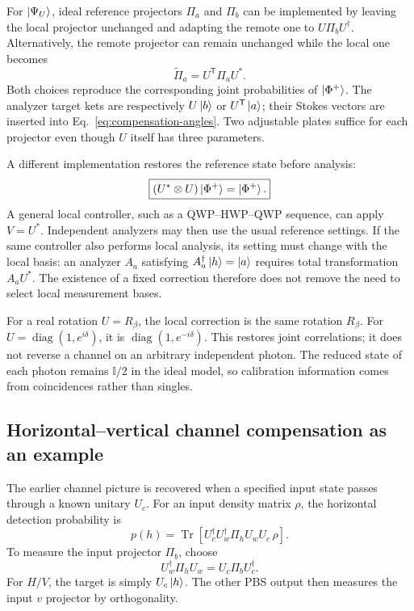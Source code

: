 \documentclass[a4paper,10pt]{article}
\newcommand{\I}{\mathbb{I}}
\newcommand{\Tr}{\operatorname{Tr}}
\begin{document}
For $\ket{\Psi_U}$, ideal reference projectors $\Pi_a$ and $\Pi_b$ can
be implemented by leaving the local projector unchanged and adapting
the remote one to $U\Pi_bU^\dagger$. Alternatively, the remote
projector can remain unchanged while the local one becomes
\begin{equation}
    \widetilde{\Pi}_a=U^{\mathsf T}\Pi_aU^*.
    \label{eq:local-effective-projector}
\end{equation}
Both choices reproduce the corresponding joint probabilities of
$\ket{\Phi^+}$. The analyzer target kets are respectively $U\ket b$
or $U^{\mathsf T}\ket a$; their Stokes vectors are inserted into
Eq.~\eqref{eq:compensation-angles}. Two adjustable plates suffice for
each projector even though $U$ itself has three parameters.

A different implementation restores the reference state before analysis:
\begin{equation}
    \boxed{(U^*\otimes U)\ket{\Phi^+}=\ket{\Phi^+}.}
    \label{eq:local-channel-correction}
\end{equation}
A general local controller, such as a QWP--HWP--QWP sequence, can apply
$V=U^*$. Independent analyzers may then use the usual reference settings.
If the same controller also performs local analysis, its setting must
change with the local basis: an analyzer $A_a$ satisfying
$A_a^\dagger\ket h=\ket a$ requires total transformation $A_aU^*$.
The existence of a fixed correction therefore does not remove the need
to select local measurement bases.

For a real rotation $U=R_\beta$, the local correction is the same
rotation $R_\beta$. For $U=\operatorname{diag}(1,e^{i\delta})$, it is
$\operatorname{diag}(1,e^{-i\delta})$. This restores joint correlations;
it does not reverse a channel on an arbitrary independent photon.
The reduced state of each photon remains $\I/2$ in the ideal model,
so calibration information comes from coincidences rather than singles.

\subsection{Horizontal--vertical channel compensation as an example}

The earlier channel picture is recovered when a specified input state
passes through a known unitary $U_c$. For an input density matrix $\rho$,
the horizontal detection probability is
\begin{equation}
    p(h)=\Tr\!\left[
        U_c^\dagger U_w^\dagger\Pi_hU_wU_c\,\rho
    \right].
\end{equation}
To measure the input projector $\Pi_b$, choose
\begin{equation}
    U_w^\dagger\Pi_hU_w=U_c\Pi_bU_c^\dagger.
    \label{eq:arbitrary-basis-condition}
\end{equation}
For $H/V$, the target is simply $U_c\ket h$. The other PBS output
then measures the input $v$ projector by orthogonality.
\end{document}
